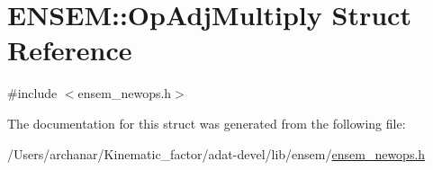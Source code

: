 \hypertarget{structENSEM_1_1OpAdjMultiply}{}\section{E\+N\+S\+EM\+:\+:Op\+Adj\+Multiply Struct Reference}
\label{structENSEM_1_1OpAdjMultiply}


{\ttfamily \#include $<$ensem\+\_\+newops.\+h$>$}



The documentation for this struct was generated from the following file\+:\begin{DoxyCompactItemize}
\item 
/\+Users/archanar/\+Kinematic\+\_\+factor/adat-\/devel/lib/ensem/\mbox{\hyperlink{adat-devel_2lib_2ensem_2ensem__newops_8h}{ensem\+\_\+newops.\+h}}\end{DoxyCompactItemize}
